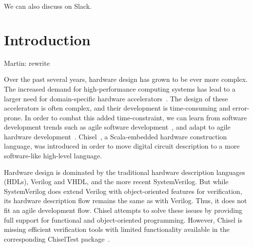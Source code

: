 \documentclass[conference]{IEEEtran}
\newcommand{\martin}[1]{{\color{blue} Martin: #1}}
\begin{document}
We can also discuss on Slack.

\section{Introduction}
\label{sec:introduction}

\martin{rewrite}

Over the past several years, hardware design has grown to be ever more complex.
The increased demand for high-performance computing systems has lead to a larger need for domain-specific hardware accelerators~\cite{domain-hw-acc:2020}.
The design of these accelerators is often complex, and their development is time-consuming and error-prone.
In order to combat this added time-constraint, we can learn from software development trends such as agile software development~\cite{agile:manifesto}, and adapt to agile hardware development~\cite{henn-patt:turing:2019}.
Chisel~\cite{chisel:dac2012}, a Scala-embedded hardware construction language, was introduced in order to move digital circuit description to a more software-like high-level language. 

Hardware design is dominated by the traditional hardware description languages (HDLs), Verilog and VHDL, and %
the more recent SystemVerilog. But while SystemVerilog  %
does extend Verilog with object-oriented features for verification, its hardware %
description flow remains the same as with Verilog. Thus, it does not fit an agile %
development flow. %
Chisel attempts to solve these issues by providing full support for %
functional and object-oriented programming. However, Chisel is missing efficient verification tools %
with limited functionality available in the corresponding ChiselTest package~\cite{chisel:tester2}. %
\end{document}
